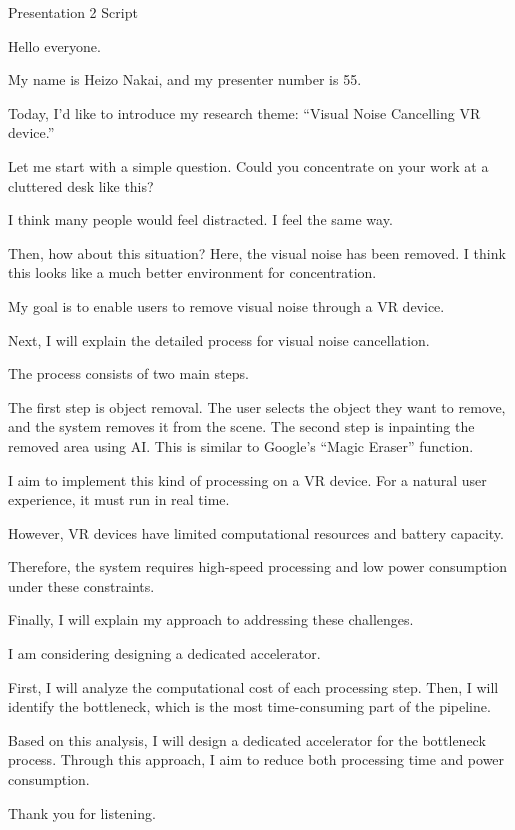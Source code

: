 \documentclass[12pt,a4paper]{article}
\begin{document}
\begin{center}
{\LARGE Presentation 2 Script}
\end{center}

Hello everyone.

My name is Heizo Nakai, and my presenter number is 55.

Today, I'd like to introduce my research theme: ``Visual Noise Cancelling VR device.''

Let me start with a simple question.
Could you concentrate on your work at a cluttered desk like this?

I think many people would feel distracted.
I feel the same way.

Then, how about this situation?
Here, the visual noise has been removed.
I think this looks like a much better environment for concentration.

My goal is to enable users to remove visual noise through a VR device.

Next, I will explain the detailed process for visual noise cancellation.

The process consists of two main steps.

The first step is object removal.
The user selects the object they want to remove,
 and the system removes it from the scene.
The second step is inpainting the removed area using AI.
This is similar to Google's ``Magic Eraser'' function.

I aim to implement this kind of processing on a VR device.
For a natural user experience, it must run in real time.

However, VR devices have limited computational resources and battery capacity.

Therefore, the system requires high-speed processing and low power consumption
under these constraints.

Finally, I will explain my approach to addressing these challenges.

I am considering designing a dedicated accelerator.

First, I will analyze the computational cost of each processing step.
Then, I will identify the bottleneck, which is the most time-consuming part of the pipeline.

Based on this analysis, I will design a dedicated accelerator for the bottleneck process.
Through this approach, I aim to reduce both processing time and power consumption.

Thank you for listening.
\end{document}
